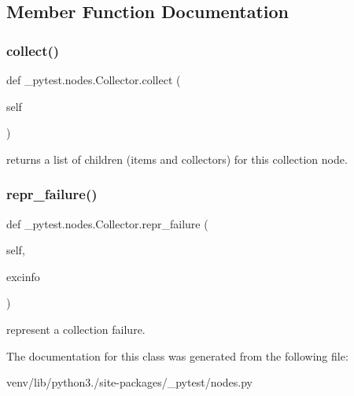\subsection{Member Function Documentation}
\mbox{\label{class__pytest_1_1nodes_1_1_collector_a2eb5899d8bd9caa8406114fab225d207}} 
\subsubsection{\texorpdfstring{collect()}{collect()}}
{\footnotesize\ttfamily def \+\_\+pytest.\+nodes.\+Collector.\+collect (\begin{DoxyParamCaption}\item[{}]{self }\end{DoxyParamCaption})}

\begin{DoxyVerb}returns a list of children (items and collectors)
    for this collection node.
\end{DoxyVerb}
 \mbox{\label{class__pytest_1_1nodes_1_1_collector_a198262bcafadc41fcaf8e60cee56eba6}} 
\subsubsection{\texorpdfstring{repr\+\_\+failure()}{repr\_failure()}}
{\footnotesize\ttfamily def \+\_\+pytest.\+nodes.\+Collector.\+repr\+\_\+failure (\begin{DoxyParamCaption}\item[{}]{self,  }\item[{}]{excinfo }\end{DoxyParamCaption})}

\begin{DoxyVerb}represent a collection failure. \end{DoxyVerb}
 

The documentation for this class was generated from the following file\+:\begin{DoxyCompactItemize}
\item 
venv/lib/python3./site-\/packages/\+\_\+pytest/nodes.\+py\end{DoxyCompactItemize}
